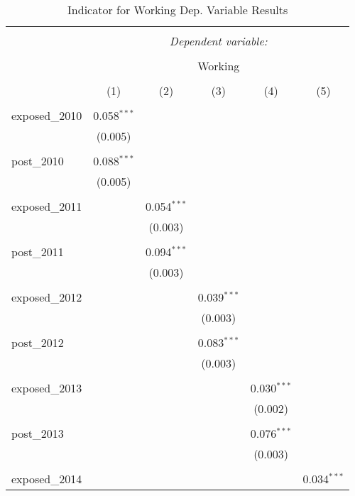 
\begin{table}[!htbp] \centering 
  \caption{Indicator for Working Dep. Variable Results} 
  \label{} 
\begin{tabular}{@{\extracolsep{5pt}}lccccc} 
\\[-1.8ex]\hline 
\hline \\[-1.8ex] 
 & \multicolumn{5}{c}{\textit{Dependent variable:}} \\ 
\cline{2-6} 
\\[-1.8ex] & \multicolumn{5}{c}{Working} \\ 
\\[-1.8ex] & (1) & (2) & (3) & (4) & (5)\\ 
\hline \\[-1.8ex] 
 exposed\_2010 & 0.058$^{***}$ &  &  &  &  \\ 
  & (0.005) &  &  &  &  \\ 
  & & & & & \\ 
 post\_2010 & 0.088$^{***}$ &  &  &  &  \\ 
  & (0.005) &  &  &  &  \\ 
  & & & & & \\ 
 exposed\_2011 &  & 0.054$^{***}$ &  &  &  \\ 
  &  & (0.003) &  &  &  \\ 
  & & & & & \\ 
 post\_2011 &  & 0.094$^{***}$ &  &  &  \\ 
  &  & (0.003) &  &  &  \\ 
  & & & & & \\ 
 exposed\_2012 &  &  & 0.039$^{***}$ &  &  \\ 
  &  &  & (0.003) &  &  \\ 
  & & & & & \\ 
 post\_2012 &  &  & 0.083$^{***}$ &  &  \\ 
  &  &  & (0.003) &  &  \\ 
  & & & & & \\ 
 exposed\_2013 &  &  &  & 0.030$^{***}$ &  \\ 
  &  &  &  & (0.002) &  \\ 
  & & & & & \\ 
 post\_2013 &  &  &  & 0.076$^{***}$ &  \\ 
  &  &  &  & (0.003) &  \\ 
  & & & & & \\ 
 exposed\_2014 &  &  &  &  & 0.034$^{***}$ \\ 

\end{tabular}
\end{table}
